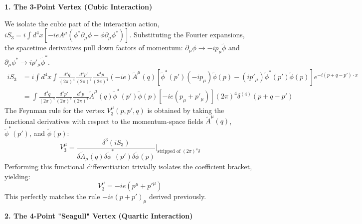 \textbf{1. The 3-Point Vertex (Cubic Interaction)}

We isolate the cubic part of the interaction action, $iS_3 = i \int d^4x \left[ -ieA^\mu ( \phi^* \partial_\mu \phi - \phi \partial_\mu \phi^* ) \right]$. Substituting the Fourier expansions, the spacetime derivatives pull down factors of momentum: $\partial_\mu \phi \to -i p_\mu \tilde{\phi}$ and $\partial_\mu \phi^* \to i p'_\mu \tilde{\phi}^*$.
\[
    \begin{aligned}
        iS_3 & = i \int d^4x \int \frac{d^4q}{(2\pi)^4} \frac{d^4p'}{(2\pi)^4} \frac{d^4p}{(2\pi)^4} (-ie) \tilde{A}^\mu(q) \left[ \tilde{\phi}^*(p')(-ip_\mu)\tilde{\phi}(p) - (ip'_\mu)\tilde{\phi}^*(p')\tilde{\phi}(p) \right] e^{-i(p + q - p')\cdot x} \\
             & = \int \frac{d^4q}{(2\pi)^4} \frac{d^4p'}{(2\pi)^4} \frac{d^4p}{(2\pi)^4} \tilde{A}^\mu(q) \tilde{\phi}^*(p') \tilde{\phi}(p) \left[ -ie (p_\mu + p'_\mu) \right] (2\pi)^4 \delta^{(4)}(p + q - p')
    \end{aligned}
\]
The Feynman rule for the vertex $V_3^\mu(p, p', q)$ is obtained by taking the functional derivatives with respect to the momentum-space fields $\tilde{A}^\mu(q)$, $\tilde{\phi}^*(p')$, and $\tilde{\phi}(p)$:
\[
    V_3^\mu = \frac{\delta^3 (iS_3)}{\delta \tilde{A}_\mu(q) \delta \tilde{\phi}^*(p') \delta \tilde{\phi}(p)} \Bigg|_{\text{stripped of } (2\pi)^4\delta}
\]
Performing this functional differentiation trivially isolates the coefficient bracket, yielding:
\[
    V_3^\mu = -ie(p^\mu + p'^\mu)
\]
This perfectly matches the rule $-ie(p + p')_\mu$ derived previously.

\textbf{2. The 4-Point "Seagull" Vertex (Quartic Interaction)}

